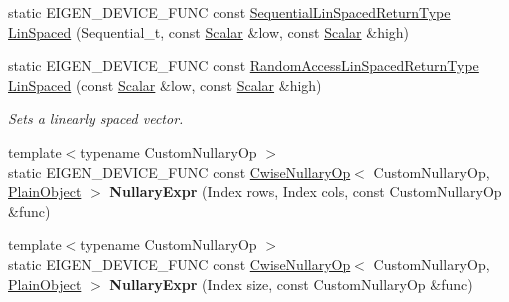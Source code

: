 \begin{DoxyCompactItemize}
static E\+I\+G\+E\+N\+\_\+\+D\+E\+V\+I\+C\+E\+\_\+\+F\+U\+NC const \mbox{\hyperlink{class_eigen_1_1_cwise_nullary_op}{Sequential\+Lin\+Spaced\+Return\+Type}} \mbox{\hyperlink{class_eigen_1_1_dense_base_ad69f2e4769d8b4e667fafba18c9cfb56}{Lin\+Spaced}} (Sequential\+\_\+t, const \mbox{\hyperlink{class_eigen_1_1_dense_base_a5feed465b3a8e60c47e73ecce83e39a2}{Scalar}} \&low, const \mbox{\hyperlink{class_eigen_1_1_dense_base_a5feed465b3a8e60c47e73ecce83e39a2}{Scalar}} \&high)
\item 
static E\+I\+G\+E\+N\+\_\+\+D\+E\+V\+I\+C\+E\+\_\+\+F\+U\+NC const \mbox{\hyperlink{class_eigen_1_1_cwise_nullary_op}{Random\+Access\+Lin\+Spaced\+Return\+Type}} \mbox{\hyperlink{class_eigen_1_1_dense_base_a1dd502457286f60df1c3e90f9192c542}{Lin\+Spaced}} (const \mbox{\hyperlink{class_eigen_1_1_dense_base_a5feed465b3a8e60c47e73ecce83e39a2}{Scalar}} \&low, const \mbox{\hyperlink{class_eigen_1_1_dense_base_a5feed465b3a8e60c47e73ecce83e39a2}{Scalar}} \&high)
\begin{DoxyCompactList}\small\item\em Sets a linearly spaced vector. \end{DoxyCompactList}\item 
\mbox{\label{class_eigen_1_1_dense_base_a9b7423589015978a4c6d56b40b7fff65}} 
{\footnotesize template$<$typename Custom\+Nullary\+Op $>$ }\\static E\+I\+G\+E\+N\+\_\+\+D\+E\+V\+I\+C\+E\+\_\+\+F\+U\+NC const \mbox{\hyperlink{class_eigen_1_1_cwise_nullary_op}{Cwise\+Nullary\+Op}}$<$ Custom\+Nullary\+Op, \mbox{\hyperlink{class_eigen_1_1_dense_base_aae45af9b5aca5a9caae98fd201f47cc4}{Plain\+Object}} $>$ {\bfseries Nullary\+Expr} (Index rows, Index cols, const Custom\+Nullary\+Op \&func)
\item 
\mbox{\label{class_eigen_1_1_dense_base_a01e86a3c1b897c9393e69edac328e578}} 
{\footnotesize template$<$typename Custom\+Nullary\+Op $>$ }\\static E\+I\+G\+E\+N\+\_\+\+D\+E\+V\+I\+C\+E\+\_\+\+F\+U\+NC const \mbox{\hyperlink{class_eigen_1_1_cwise_nullary_op}{Cwise\+Nullary\+Op}}$<$ Custom\+Nullary\+Op, \mbox{\hyperlink{class_eigen_1_1_dense_base_aae45af9b5aca5a9caae98fd201f47cc4}{Plain\+Object}} $>$ {\bfseries Nullary\+Expr} (Index size, const Custom\+Nullary\+Op \&func)
\item 
\mbox{\label{class_eigen_1_1_dense_base_a7fe1bc96d548a621d2efd0b8c741a049}} 

\end{DoxyCompactItemize}
